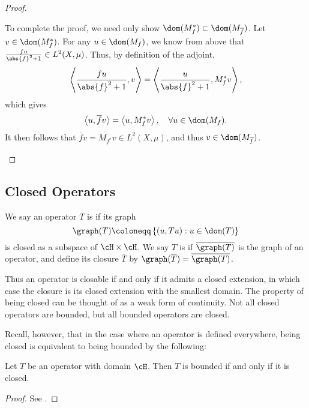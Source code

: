\documentclass[oneside,reqno,letterpaper]{amsart}
\begin{document}
\begin{proof}
\begin{enumerate}[label=(\alph*)]
  To complete the proof, we need only show \(\dom(M_{f}^*) \subset \dom(M_{\overline{f}})\). 
  Let \(v \in \dom(M_{f}^*)\). 
  For any \(u \in \dom(M_f)\), we know from above that \(\frac{fu}{\abs{f}^2 + 1} \in L^2(X, \mu)\).
  Thus, by definition of the adjoint, 
  \[
  \left< \frac{fu}{\abs{f}^2 + 1}, v \right> 
  = \left< \frac{u}{\abs{f}^2 + 1}, M_f^* v \right>, 
  \] 
  which gives
  \[
    \left< u, \overline{f} v \right> = \left< u, M_f^* v \right>, \quad \forall u \in \dom(M_f) . 
  \] 
  It then follows that \(\overline{f} v = M_{f^*} v \in L^2(X, \mu)\), and thus \(v \in \dom(M_{\overline{f}})\). 
\end{enumerate}
\end{proof}




\subsection{Closed Operators}

\begin{definition}
  We say an operator \(T\) is  if its graph
  \[
  \graph(T) \coloneqq \left\{ (u, Tu): u \in \dom(T) \right\}
  \] 
  is closed as a subspace of \(\cH \times \cH\). 
  We say \(T\) is  if \(\overline{\graph(T)}\) is the graph of an operator, and define its closure \(\overline{T}\) by \(\graph(\overline{T}) = \overline{\graph(T)}\).
\end{definition}

Thus an operator is closable if and only if it admits a closed extension, in which case the closure is its closed extension with the smallest domain. 
The property of being closed can be thought of as a weak form of continuity.
Not all closed operators are bounded, but all bounded operators are closed. 

Recall, however, that in the case where an operator is defined everywhere, being closed is equivalent to being bounded by the following:
\begin{theorem}
\label{thm:closed-graph}
  Let \(T\) be an operator with domain \(\cH\). Then \(T\) is bounded if and only if it is closed. 
\end{theorem}
\begin{proof}
  See \cite[p.~37]{brezis2011functional}. 
\end{proof}
\end{document}
